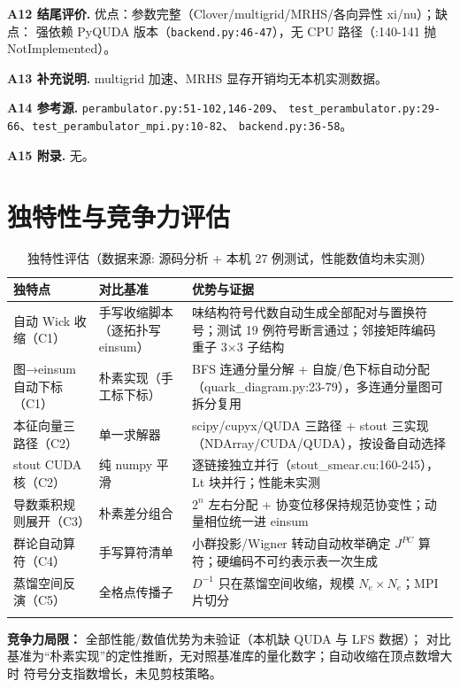 \documentclass[UTF8]{ctexart}
\begin{document}
\textbf{A12 结尾评价.} 优点：参数完整（Clover/multigrid/MRHS/各向异性 xi/nu）；缺点：
强依赖 PyQUDA 版本（\texttt{\nolinkurl{backend.py:46-47}}），无 CPU 路径（:140-141 抛 NotImplemented）。

\textbf{A13 补充说明.} multigrid 加速、MRHS 显存开销均无本机实测数据。

\textbf{A14 参考源.} \texttt{\nolinkurl{perambulator.py:51-102,146-209}}、
\texttt{\nolinkurl{test_perambulator.py:29-66}}、\texttt{\nolinkurl{test_perambulator_mpi.py:10-82}}、
\texttt{\nolinkurl{backend.py:36-58}}。

\textbf{A15 附录.} 无。

\section{独特性与竞争力评估}
{\footnotesize\begin{xltabular}{\textwidth}{lXX}
\toprule
\textcolor{algo}{独特点} & 对比基准 & 优势与证据 \\
\midrule
\endhead
自动 Wick 收缩（C1） & 手写收缩脚本（逐拓扑写 einsum） & 味结构符号代数自动生成全部配对与置换符号；测试 19 例符号断言通过；邻接矩阵编码重子 3$\times$3 子结构 \\
图→einsum 自动下标（C1） & 朴素实现（手工标下标） & BFS 连通分量分解 + 自旋/色下标自动分配（quark\_diagram.py:23-79），多连通分量图可拆分复用 \\
本征向量三路径（C2） & 单一求解器 & scipy/cupyx/QUDA 三路径 + stout 三实现（NDArray/CUDA/QUDA），按设备自动选择 \\
stout CUDA 核（C2） & 纯 numpy 平滑 & 逐链接独立并行（stout\_smear.cu:160-245），Lt 块并行；性能未实测 \\
导数乘积规则展开（C3） & 朴素差分组合 & $2^n$ 左右分配 + 协变位移保持规范协变性；动量相位统一进 einsum \\
群论自动算符（C4） & 手写算符清单 & 小群投影/Wigner 转动自动枚举确定 $J^{PC}$ 算符；硬编码不可约表示表一次生成 \\
蒸馏空间反演（C5） & 全格点传播子 & $D^{-1}$ 只在蒸馏空间收缩，规模 $N_e\times N_e$；MPI 片切分 \\
\bottomrule
\caption{独特性评估（数据来源: 源码分析 + 本机 27 例测试，性能数值均未实测）}
\end{xltabular}}

\begin{warnbox}
\textbf{竞争力局限：} 全部性能/数值优势为\textcolor{warn}{未验证}（本机缺 QUDA 与 LFS 数据）；
对比基准为``朴素实现''的定性推断，无对照基准库的量化数字；自动收缩在顶点数增大时
符号分支指数增长，未见剪枝策略。
\end{warnbox}
\end{document}
